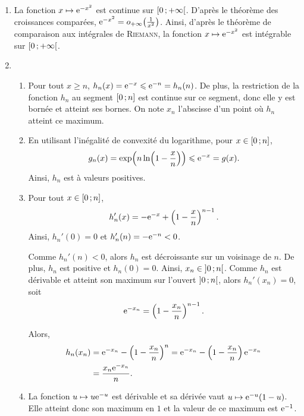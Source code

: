 \begin{demo}
\begin{enumerate}
\item La fonction $x \mapsto \mathrm{e}^{-x^2}$ est continue sur $\left[0\,;+\infty\right[$. D'après le théorème des croissances comparées, $\mathrm{e}^{-x^2} = o_{+\infty}\mathopen{}\left(\frac{1}{x^2}\right)$. Ainsi, d'après le théorème de comparaison aux intégrales de \textsc{Riemann}, la fonction $x \mapsto \mathrm{e}^{-x^2}$ est intégrable sur $\left[0\,;+\infty\right[$.

\item
\begin{enumerate}
\item Pour tout $x \geqslant n$, $h_n(x) = \mathrm{e}^{-x} \leqslant \mathrm{e}^{-n} = h_n(n)$. De plus, la restriction de la fonction $h_n$ au segment $\left[0\,;n\right]$ est continue sur ce segment, donc elle y est bornée et atteint ses bornes. On note $x_n$ l'abscisse d'un point où $h_n$ atteint ce maximum.

\item {}En utilisant l'inégalité de convexité du logarithme, pour $x \in \left[0\,;n\right]$,
\[
g_n(x)
= \exp\mathopen{}\left(n \ln\mathopen{}\left(1 - \frac{x}{n}\right)\right)
\leqslant \mathrm{e}^{-x} = g(x).
\]
Ainsi, $h_n$ est à valeurs positives.

\item Pour tout $x \in \left[0\,;n\right]$,
\[
h_n'(x) = -\mathrm{e}^{-x} + \left(1 - \frac{x}{n}\right)^{n-1}.
\]
Ainsi, $h_n'(0) = 0$ et $h_n'(n) = - \mathrm{e}^{-n} < 0$.

Comme $h_n'(n) < 0$, alors $h_n$ est décroissante sur un voisinage de $n$. De plus, $h_n$ est positive et $h_n(0) = 0$. Ainsi, $x_n \in \left]0\,;n\right[$. Comme $h_n$ est dérivable et atteint son maximum sur l'ouvert $\left]0\,;n\right[$, alors $h_n'(x_n) = 0$, soit
\[
\mathrm{e}^{-x_n} = \left(1 - \frac{x_n}{n}\right)^{n-1}.
\]

Alors,
\begin{align*}
h_n(x_n)
&= \mathrm{e}^{-x_n} - \left(1 - \frac{x_n}{n}\right)^n
= \mathrm{e}^{-x_n} - \left(1 - \frac{x_n}{n}\right) \mathrm{e}^{-x_n}\\
&= \frac{x_n \mathrm{e}^{-x_n}}{n}.
\end{align*}

\item La fonction $u \mapsto u \mathrm{e}^{-u}$ est dérivable et sa dérivée vaut $u \mapsto \mathrm{e}^{-u} (1 - u)$. Elle atteint donc son maximum en $1$ et la valeur de ce maximum est $\mathrm{e}^{-1}$.


\end{enumerate}
\end{enumerate}
\end{demo}
